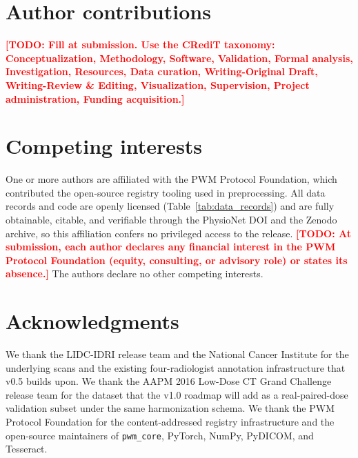 \documentclass[twoside,11pt]{article}
\newcommand{\todo}[1]{\textcolor{red}{\textbf{[TODO: #1]}}}
\begin{document}
\section*{Author contributions}

\todo{Fill at submission. Use the CRediT taxonomy: Conceptualization, Methodology, Software, Validation, Formal analysis, Investigation, Resources, Data curation, Writing-Original Draft, Writing-Review \& Editing, Visualization, Supervision, Project administration, Funding acquisition.}

\section*{Competing interests}

One or more authors are affiliated with the PWM Protocol Foundation, which contributed the open-source registry tooling used in preprocessing. All data records and code are openly licensed (Table~\ref{tab:data_records}) and are fully obtainable, citable, and verifiable through the PhysioNet DOI and the Zenodo archive, so this affiliation confers no privileged access to the release. \todo{At submission, each author declares any financial interest in the PWM Protocol Foundation (equity, consulting, or advisory role) or states its absence.} The authors declare no other competing interests.

\section*{Acknowledgments}

We thank the LIDC-IDRI release team and the National Cancer Institute for the underlying scans and the existing four-radiologist annotation infrastructure that v0.5 builds upon. We thank the AAPM 2016 Low-Dose CT Grand Challenge release team for the dataset that the v1.0 roadmap will add as a real-paired-dose validation subset under the same harmonization schema. We thank the PWM Protocol Foundation for the content-addressed registry infrastructure and the open-source maintainers of \texttt{pwm\_core}, PyTorch, NumPy, PyDICOM, and Tesseract.



\end{document}
